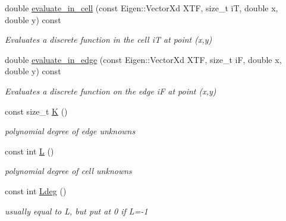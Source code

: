 \begin{DoxyCompactItemize}
double \hyperlink{classHCore2D_1_1HybridCore_a58dd478934c1f5b65ae8b7df31e8ead4}{evaluate\+\_\+in\+\_\+cell} (const Eigen\+::\+Vector\+Xd X\+TF, size\+\_\+t iT, double x, double y) const
\begin{DoxyCompactList}\small\item\em Evaluates a discrete function in the cell iT at point (x,y) \end{DoxyCompactList}\item 
\mbox{\label{classHCore2D_1_1HybridCore_ae6795e8bc0058be7e399b379333032c8}} 
double \hyperlink{classHCore2D_1_1HybridCore_ae6795e8bc0058be7e399b379333032c8}{evaluate\+\_\+in\+\_\+edge} (const Eigen\+::\+Vector\+Xd X\+TF, size\+\_\+t iF, double x, double y) const
\begin{DoxyCompactList}\small\item\em Evaluates a discrete function on the edge iF at point (x,y) \end{DoxyCompactList}\item 
\mbox{\label{classHCore2D_1_1HybridCore_a74242d0a8b68fe5d9a35c6eb0effe3b2}} 
const size\+\_\+t \hyperlink{classHCore2D_1_1HybridCore_a74242d0a8b68fe5d9a35c6eb0effe3b2}{K} ()
\begin{DoxyCompactList}\small\item\em polynomial degree of edge unknowns \end{DoxyCompactList}\item 
\mbox{\label{classHCore2D_1_1HybridCore_af5aea2e23e91c582d8c8189a5bc7ae96}} 
const int \hyperlink{classHCore2D_1_1HybridCore_af5aea2e23e91c582d8c8189a5bc7ae96}{L} ()
\begin{DoxyCompactList}\small\item\em polynomial degree of cell unknowns \end{DoxyCompactList}\item 
\mbox{\label{classHCore2D_1_1HybridCore_abc772d1adc056fb4bf725f39c92edbb5}} 
const int \hyperlink{classHCore2D_1_1HybridCore_abc772d1adc056fb4bf725f39c92edbb5}{Ldeg} ()
\begin{DoxyCompactList}\small\item\em usually equal to L, but put at 0 if L=-\/1 \end{DoxyCompactList}\item 

\end{DoxyCompactItemize}
